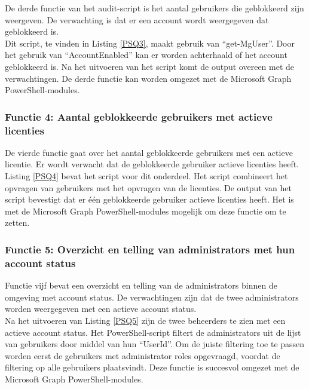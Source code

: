 De derde functie van het audit-script is het aantal gebruikers die geblokkeerd zijn weergeven. De verwachting is dat er een account wordt weergegeven dat geblokkeerd is. \\

Dit script, te vinden in Listing \ref{PSQ3}, maakt gebruik van “get-MgUser”. Door het gebruik van “AccountEnabled” kan er worden achterhaald of het account geblokkeerd is. Na het uitvoeren van het script komt de output overeen met de verwachtingen. De derde functie kan worden omgezet met de Microsoft Graph PowerShell-modules. 

\subsubsection{Functie 4: Aantal geblokkeerde gebruikers met actieve licenties}


De vierde functie gaat over het aantal geblokkeerde gebruikers met een actieve licentie. Er wordt verwacht dat de geblokkeerde gebruiker actieve licenties heeft. \\

Listing \ref{PSQ4} bevat het script voor dit onderdeel. Het script combineert het opvragen van gebruikers met het opvragen van de licenties. De output van het script bevestigt dat er één geblokkeerde gebruiker actieve licenties heeft. Het is met de Microsoft Graph PowerShell-modules mogelijk om deze functie om te zetten.

\subsubsection{Functie 5: Overzicht en telling van administrators met hun account status}


Functie vijf bevat een overzicht en telling van de administrators binnen de omgeving met account status. De verwachtingen zijn dat de twee administrators worden weergegeven met een actieve account status. \\

Na het uitvoeren van Listing \ref{PSQ5} zijn de twee beheerders te zien met een actieve account status. Het PowerShell-script filtert de administrators uit de lijst van gebruikers door middel van hun “UserId”. Om de juiste filtering toe te passen worden eerst de gebruikers met administrator roles opgevraagd, voordat de filtering op alle gebruikers plaatsvindt. Deze functie is succesvol omgezet met de Microsoft Graph PowerShell-modules.

